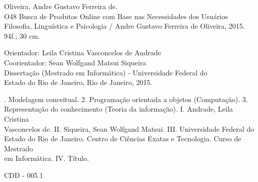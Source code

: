 \vspace*{14.0cm}
\begin{framed}
    \fontsize{10pt}{10pt}\selectfont \hspace*{0.5cm} Oliveira, Andre Gustavo Ferreira de. \\ O48 \hspace{0.8cm}Busca de Produtos Online com Base nas Necessidades dos Usuários \\ \hspace*{1.3cm} Filosofia, Linguística e Psicologia / Andre Gustavo Ferreira de Oliveira, 2015. \\ \hspace*{1.3cm} 94f.; 30 cm.
    \vspace{0.3cm}

    \noindent \hspace*{1.5cm} \fontsize{10pt}{10pt}\selectfont Orientador: Leila Cristina Vasconcelos de Andrade \\ \hspace*{1.6cm} Coorientador: Sean Wolfgand Matsui Siqueira \\ \hspace*{1.6cm}Dissertação (Mestrado em Informática) - Universidade Federal do \\ \hspace*{1.2cm}Estado do Rio de Janeiro, Rio de Janeiro, 2015.
    \vspace{0.3cm}

    \noindent \hspace*{1.7cm} \fontsize{10pt}{10pt}. Modelagem conceitual. 2. Programação orientada a objetos (Computação). 3. \\ \hspace*{1.5cm} Representação do conhecimento (Teoria da informação). I. Andrade, Leila Cristina \\ \hspace*{1.5cm} Vasconcelos de. II. Siqueira, Sean Wolfgand Matsui. III. Universidade Federal do \\ \hspace*{1.5cm} Estado do Rio de Janeiro. Centro de Ciências Exatas e Tecnologia. Curso de  Mestrado \\ \hspace*{1.5cm} em Informática. IV. Título.
    \vspace{0.3cm}
    \begin{flushright}
        \fontsize{10pt}{10pt}\selectfont CDD - 005.1
    \end{flushright}
\end{framed}
